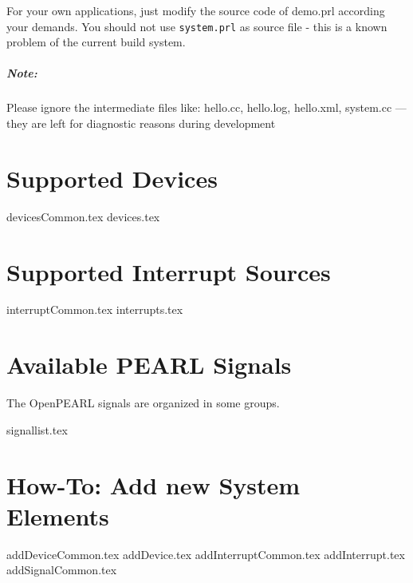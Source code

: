 \documentclass[oneside,10pt]{scrbook}
\begin{document}
For your own applications, just modify the source code of demo.prl according your demands.
You should not use \texttt{system.prl} as source file - this is a known problem of the current
build system.


\paragraph{Note:}
Please ignore the intermediate files like:
hello.cc, hello.log, hello.xml, system.cc --- they are left for diagnostic 
reasons during development



\chapter{Supported Devices}
{devicesCommon.tex}
{devices.tex}

\chapter{Supported Interrupt Sources}
{interruptCommon.tex}
{interrupts.tex}

\chapter{Available PEARL Signals}
The OpenPEARL signals are organized in some groups.

{signallist.tex}


\chapter{How-To: Add new System Elements}
{addDeviceCommon.tex}
{addDevice.tex}
{addInterruptCommon.tex}
{addInterrupt.tex}
{addSignalCommon.tex}
\end{document}
